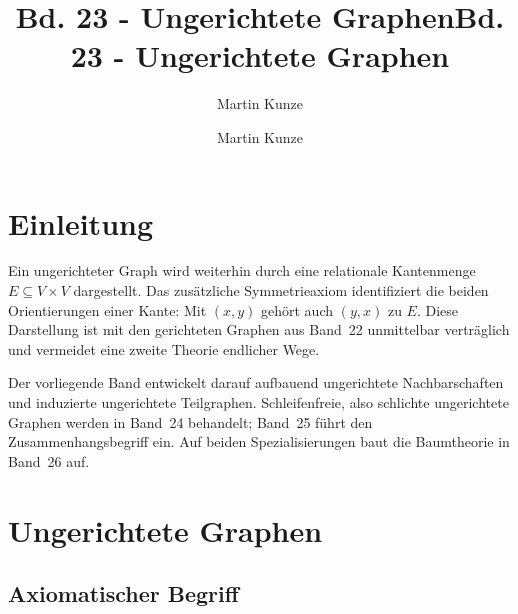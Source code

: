 \documentclass[main.tex]{subfiles}
\title{Bd. 23 - Ungerichtete Graphen}
\author{Martin Kunze}
\date{}
\begin{document}
\title{Bd. 23 - Ungerichtete Graphen}
\author{Martin Kunze}
\date{}
\hypersetup{pageanchor=false}
\maketitle
\hypersetup{pageanchor=true}
\setcounter{tocdepth}{3}
\tableofcontents
\setcounter{file}{23}
\renewcommand{\FormulaBandID}{23}

\chapter{Einleitung}

Ein ungerichteter Graph wird weiterhin durch eine relationale Kantenmenge
\(E\subseteq V\times V\) dargestellt. Das zusätzliche Symmetrieaxiom
identifiziert die beiden Orientierungen einer Kante: Mit \((x,y)\) gehört
auch \((y,x)\) zu \(E\). Diese Darstellung ist mit den gerichteten Graphen
aus Band~22 unmittelbar verträglich und vermeidet eine zweite Theorie
endlicher Wege.

Der vorliegende Band entwickelt darauf aufbauend ungerichtete
Nachbarschaften und induzierte ungerichtete Teilgraphen. Schleifenfreie,
also schlichte ungerichtete Graphen werden in Band~24 behandelt; Band~25
führt den Zusammenhangsbegriff ein. Auf beiden Spezialisierungen baut die
Baumtheorie in Band~26 auf.

\chapter{Ungerichtete Graphen}

\section{Axiomatischer Begriff}



\end{document}
